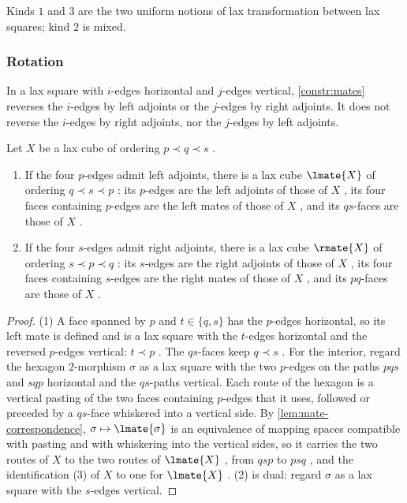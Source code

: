 %
Kinds $1$ and $3$ are the two uniform notions of lax transformation between lax
squares; kind $2$ is mixed.

\subsubsection*{Rotation}
%
In a lax square with $i$-edges horizontal and $j$-edges vertical,
\cref{constr:mates} reverses the $i$-edges by left adjoints or the $j$-edges by
right adjoints. It does not reverse the $i$-edges by right adjoints,
nor the $j$-edges by left adjoints.

\begin{prop}
\label{prop:cube-rotation}
%
Let $X$ be a lax cube of ordering $p \prec q \prec s$ .
\begin{enumerate}
\item If the four $p$-edges admit left adjoints,
there is a lax cube $\lmate{X}$ of ordering $q \prec s \prec p$ :
its $p$-edges are the left adjoints of those of $X$ ,
its four faces containing $p$-edges are the left mates of those of $X$ ,
and its $qs$-faces are those of $X$ .
\item If the four $s$-edges admit right adjoints,
there is a lax cube $\rmate{X}$ of ordering $s \prec p \prec q$ :
its $s$-edges are the right adjoints of those of $X$ ,
its four faces containing $s$-edges are the right mates of those of $X$ ,
and its $pq$-faces are those of $X$ .
\end{enumerate}
\end{prop}

\begin{proof}
%
(1) A face spanned by $p$ and $t \in \{q,s\}$ has the $p$-edges horizontal,
so its left mate is defined and is a lax square with the $t$-edges horizontal
and the reversed $p$-edges vertical: $t \prec p$ .
The $qs$-faces keep $q \prec s$ . For the interior,
regard the hexagon $2$-morphism $\sigma$ as a lax square with the two $p$-edges
on the paths $pqs$ and $sqp$ horizontal and the $qs$-paths vertical.
Each route of the hexagon is a vertical pasting of the two faces containing
$p$-edges that it uses, followed or preceded by a $qs$-face whiskered into a
vertical side. By \cref{lem:mate-correspondence},
$\sigma \mapsto \lmate{\sigma}$
is an equivalence of mapping spaces compatible with pasting and with whiskering
into the vertical sides, so it carries the two routes of $X$ to the two routes
of $\lmate{X}$ , from $qsp$ to $psq$ , and the identification (3) of $X$ to one
for $\lmate{X}$ .
(2) is dual: regard $\sigma$ as a lax square with the $s$-edges vertical.
\end{proof}

